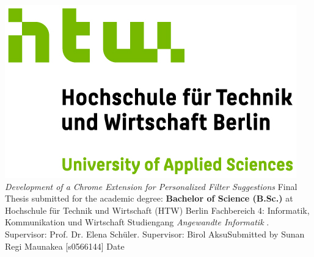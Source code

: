 \documentclass[oneside,bibliography=totocnumbered,BCOR=5mm]{scrbook}%
\theoremstyle{definition}
\theoremstyle{definition}
\theoremstyle{definition}
\theoremstyle{definition}
\theoremstyle{definition}
\theoremstyle{definition}
\begin{document}
\begin{titlepage}
  \begin{center}
    \includegraphics{assets/htw_berlin_logo_farbig.jpg}
    \linebreak[4]
    \linebreak[4]
    \linebreak[4]
    \linebreak[4]
    \textit{\large Development of a Chrome Extension for Personalized Filter Suggestions}
    \linebreak[4]
    \linebreak[4]
    \linebreak[4]
    Final Thesis
    \linebreak[4]
    \linebreak[4]
    submitted for the academic degree:
    \linebreak[4]
    \linebreak[4]
    \textbf{Bachelor of Science (B.Sc.)}
    \linebreak[4]
    \linebreak[4]
    at
    \linebreak[4]
    \linebreak[4]
    Hochschule f\"ur Technik und Wirtschaft (HTW) Berlin
    \linebreak[4]
    Fachbereich 4: Informatik, Kommunikation und Wirtschaft
    \linebreak[4]
    Studiengang \textit{Angewandte Informatik}
    \linebreak[4]
    \linebreak[4]
    . Supervisor: Prof. Dr. Elena Sch\"uler. Supervisor: Birol Aksu\linebreak[4]
    \linebreak[4]
    \linebreak[4]
    \linebreak[4]
    \linebreak[4]
    Submitted by Sunan Regi Maunakea [s0566144]
    \linebreak[4]
    \linebreak[4]
    \linebreak[4]
    \linebreak[4]
    Date
    \linebreak[4]
    


\end{center}
\end{titlepage}
\end{document}

